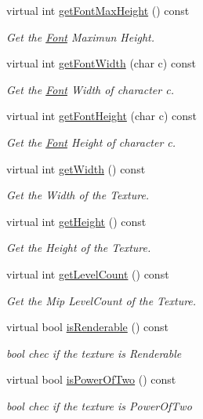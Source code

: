 \begin{DoxyCompactItemize}
\item 
virtual int \hyperlink{class_i_dream_sky_1_1_font_1_1_resource_a9ed0ec2b641669c43a7b56ea134d91ee}{get\+Font\+Max\+Height} () const 
\begin{DoxyCompactList}\small\item\em Get the \hyperlink{class_i_dream_sky_1_1_font}{Font} Maximun Height. \end{DoxyCompactList}\item 
virtual int \hyperlink{class_i_dream_sky_1_1_font_1_1_resource_a40a57d4dd7ca245a095bc66eba41c6d4}{get\+Font\+Width} (char c) const 
\begin{DoxyCompactList}\small\item\em Get the \hyperlink{class_i_dream_sky_1_1_font}{Font} Width of character c. \end{DoxyCompactList}\item 
virtual int \hyperlink{class_i_dream_sky_1_1_font_1_1_resource_a70b6f82e7077ff077da17efcb1e695f2}{get\+Font\+Height} (char c) const 
\begin{DoxyCompactList}\small\item\em Get the \hyperlink{class_i_dream_sky_1_1_font}{Font} Height of character c. \end{DoxyCompactList}\item 
virtual int \hyperlink{class_i_dream_sky_1_1_font_1_1_resource_a951366d066e4535178207445e998c93e}{get\+Width} () const 
\begin{DoxyCompactList}\small\item\em Get the Width of the Texture. \end{DoxyCompactList}\item 
virtual int \hyperlink{class_i_dream_sky_1_1_font_1_1_resource_aa1176dbf8da1bc685e7abfca42e50ab7}{get\+Height} () const 
\begin{DoxyCompactList}\small\item\em Get the Height of the Texture. \end{DoxyCompactList}\item 
virtual int \hyperlink{class_i_dream_sky_1_1_font_1_1_resource_af69f8152d18bffc60798701734e5bd33}{get\+Level\+Count} () const 
\begin{DoxyCompactList}\small\item\em Get the Mip Level\+Count of the Texture. \end{DoxyCompactList}\item 
virtual bool \hyperlink{class_i_dream_sky_1_1_font_1_1_resource_aa7a25ef59fdf2f5a96543a309474866f}{is\+Renderable} () const 
\begin{DoxyCompactList}\small\item\em bool chec if the texture is Renderable \end{DoxyCompactList}\item 
virtual bool \hyperlink{class_i_dream_sky_1_1_font_1_1_resource_aa85f09b7439ed4282cc04260f5fa25cd}{is\+Power\+Of\+Two} () const 
\begin{DoxyCompactList}\small\item\em bool chec if the texture is Power\+Of\+Two \end{DoxyCompactList}\end{DoxyCompactItemize}
